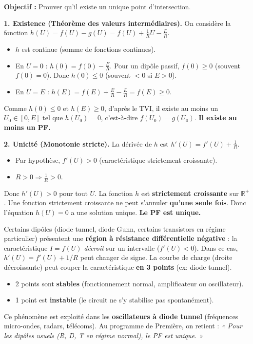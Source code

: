 \documentclass[11pt]{article}
\begin{document}
\begin{experience}
\textbf{Objectif :} Prouver qu'il existe un unique point d'intersection.

\textbf{1. Existence (Théorème des valeurs intermédiaires).}
On considère la fonction $h(U) = f(U) - g(U) = f(U) + \frac{1}{R}U - \frac{E}{R}$.
\begin{itemize}
    \item $h$ est continue (somme de fonctions continues).
    \item En $U=0$ : $h(0) = f(0) - \frac{E}{R}$. Pour un dipôle passif, $f(0) \ge 0$ (souvent $f(0)=0$). Donc $h(0) \le 0$ (souvent $<0$ si $E>0$).
    \item En $U=E$ : $h(E) = f(E) + \frac{E}{R} - \frac{E}{R} = f(E) \ge 0$.
\end{itemize}
Comme $h(0) \le 0$ et $h(E) \ge 0$, d'après le TVI, il existe au moins un $U_0 \in [0, E]$ tel que $h(U_0) = 0$, c'est-à-dire $f(U_0) = g(U_0)$. \textbf{Il existe au moins un PF.}

\textbf{2. Unicité (Monotonie stricte).}
La dérivée de $h$ est $h'(U) = f'(U) + \frac{1}{R}$.
\begin{itemize}
    \item Par hypothèse, $f'(U) > 0$ (caractéristique strictement croissante).
    \item $R > 0 \Rightarrow \frac{1}{R} > 0$.
\end{itemize}
Donc $h'(U) > 0$ pour tout $U$. La fonction $h$ est \textbf{strictement croissante} sur $\mathbb{R}^+$.
Une fonction strictement croissante ne peut s'annuler \textbf{qu'une seule fois}.
Donc l'équation $h(U)=0$ a une solution unique. \textbf{Le PF est unique.}
\end{experience}

\begin{savaistu}
Certains dipôles (diode tunnel, diode Gunn, certains transistors en régime particulier) présentent une \textbf{région à résistance différentielle négative} : la caractéristique $I=f(U)$ \emph{décroît} sur un intervalle ($f'(U) < 0$).
Dans ce cas, $h'(U) = f'(U) + 1/R$ peut changer de signe. La courbe de charge (droite décroissante) peut couper la caractéristique \textbf{en 3 points} (ex: diode tunnel).
\begin{itemize}
    \item 2 points sont \textbf{stables} (fonctionnement normal, amplificateur ou oscillateur).
    \item 1 point est \textbf{instable} (le circuit ne s'y stabilise pas spontanément).
\end{itemize}
Ce phénomène est exploité dans les \textbf{oscillateurs à diode tunnel} (fréquences micro-ondes, radars, télécoms). Au programme de Première, on retient : \emph{« Pour les dipôles usuels (R, D, T en régime normal), le PF est unique. »}
\end{savaistu}
\end{document}
